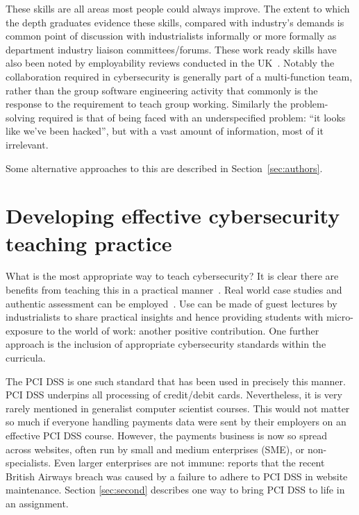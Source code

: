 \documentclass[conference]{IEEEtran}
\begin{document}
These skills are all areas most people could always improve. The extent to which the depth graduates evidence these skills, compared with industry's demands is common point of discussion with industrialists informally or more formally as department industry liaison committees/forums. These work ready skills have also been noted by employability reviews conducted in the UK~\cite{shadbolt2016shadbolt,wakeham}. Notably the collaboration required in cybersecurity is generally part of a multi-function team, rather than the group software engineering activity that commonly is the response to the requirement to teach group working. Similarly the problem-solving required is that of being faced with an underspecified problem: ``it looks like we've been hacked'', but with a vast amount of information, most of it irrelevant.

Some alternative approaches to this are described in Section~\ref{sec:authors}.

\section{Developing effective cybersecurity teaching practice}\label{practice}

What is the most appropriate way to teach cybersecurity? It is clear
there are benefits from teaching this in a practical
manner~\cite{Weiss:2013:THC:2527148.2527180}. Real world case studies
and authentic assessment can be
employed~\cite[e.g.]{BritishAirways2018a,Zoom2020a}. Use can be made
of guest lectures by industrialists to share practical insights and
hence providing students with micro-exposure to the world of work:
another positive contribution. One further approach is the inclusion
of appropriate cybersecurity standards within the curricula.

The PCI DSS \cite{PCI2018b} is one such standard that has been used in precisely this manner. PCI DSS underpins all processing of credit/debit cards. Nevertheless, it is very rarely mentioned in generalist computer scientist courses. This would not matter so much if everyone handling payments data were sent by their employers on an effective PCI DSS course. However, the payments business is now so spread across websites, often run by small and medium enterprises (SME), or non-specialists. Even larger enterprises are not immune: \cite{BritishAirways2018a} reports that the recent British Airways breach was caused by a failure to adhere to PCI DSS in website maintenance. Section \ref{sec:second} describes one way to bring PCI DSS to life in an assignment.
\end{document}
